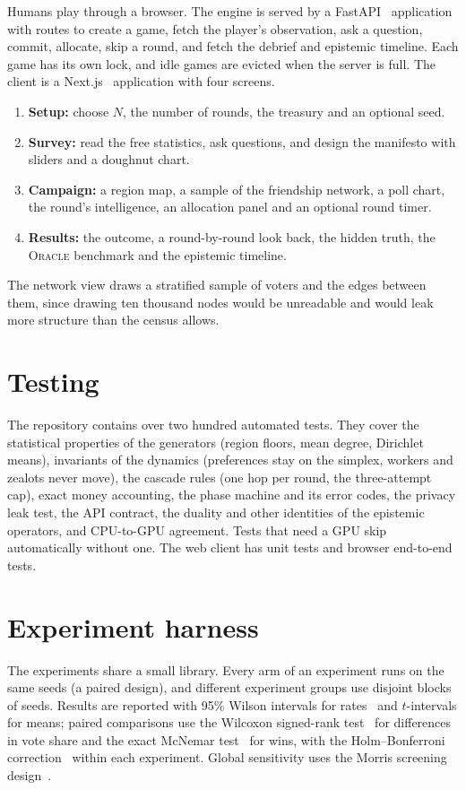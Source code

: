 \documentclass[11pt,a4paper,oneside]{report}
\newcommand{\ORACLE}{\textsc{Oracle}}
\begin{document}
Humans play through a browser. The engine is served by a FastAPI~\cite{fastapi} application with routes to
create a game, fetch the player's observation, ask a question, commit, allocate, skip a round, and fetch the
debrief and epistemic timeline. Each game has its own lock, and idle games are evicted when the server is
full. The client is a Next.js~\cite{nextjs} application with four screens.
\begin{enumerate}
  \item \textbf{Setup:} choose $N$, the number of rounds, the treasury and an optional seed.
  \item \textbf{Survey:} read the free statistics, ask questions, and design the manifesto with sliders and
        a doughnut chart.
  \item \textbf{Campaign:} a region map, a sample of the friendship network, a poll chart, the round's
        intelligence, an allocation panel and an optional round timer.
  \item \textbf{Results:} the outcome, a round-by-round look back, the hidden truth, the \ORACLE{} benchmark
        and the epistemic timeline.
\end{enumerate}
The network view draws a stratified sample of voters and the edges between them, since drawing ten thousand
nodes would be unreadable and would leak more structure than the census allows.

\section{Testing}

The repository contains over two hundred automated tests. They cover the statistical properties of the
generators (region floors, mean degree, Dirichlet means), invariants of the dynamics (preferences stay on
the simplex, workers and zealots never move), the cascade rules (one hop per round, the three-attempt
cap), exact money accounting, the phase machine and its error codes, the privacy leak test, the API
contract, the duality and other identities of the epistemic operators, and CPU-to-GPU agreement. Tests
that need a GPU skip automatically without one. The web client has unit tests and browser end-to-end tests.

\section{Experiment harness}

The experiments share a small library. Every arm of an experiment runs on the same seeds (a paired design),
and different experiment groups use disjoint blocks of seeds. Results are reported with 95\% Wilson
intervals for rates~\cite{wilson1927} and $t$-intervals for means; paired comparisons use the Wilcoxon
signed-rank test~\cite{wilcoxon1945} for differences in vote share and the exact McNemar
test~\cite{mcnemar1947} for wins, with the Holm--Bonferroni correction~\cite{holm1979} within each
experiment. Global sensitivity uses the Morris screening design~\cite{morris1991}.
\end{document}
